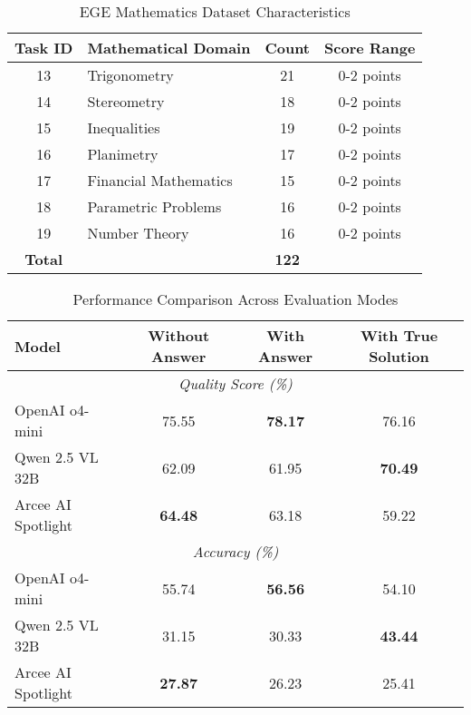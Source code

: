 \documentclass{article}
\begin{document}
\begin{table}[htbp]
\centering
\caption{EGE Mathematics Dataset Characteristics}
\label{tab:dataset_characteristics}
\begin{tabular}{@{}clcc@{}}
\toprule
\textbf{Task ID} & \textbf{Mathematical Domain} & \textbf{Count} & \textbf{Score Range} \\
\midrule
13 & Trigonometry & 21 & 0-2 points \\
14 & Stereometry & 18 & 0-2 points \\
15 & Inequalities & 19 & 0-2 points \\
16 & Planimetry & 17 & 0-2 points \\
17 & Financial Mathematics & 15 & 0-2 points \\
18 & Parametric Problems & 16 & 0-2 points \\
19 & Number Theory & 16 & 0-2 points \\
\midrule
\textbf{Total} & & \textbf{122} & \\
\bottomrule
\end{tabular}
\end{table}

\begin{table}[htbp]
\centering
\caption{Performance Comparison Across Evaluation Modes}
\label{tab:evaluation_modes}
\begin{tabular}{@{}lccc@{}}
\toprule
\textbf{Model} & \textbf{Without Answer} & \textbf{With Answer} & \textbf{With True Solution} \\
\midrule
\multicolumn{4}{c}{\textit{Quality Score (\%)}} \\
\midrule
OpenAI o4-mini & 75.55 & \textbf{78.17} & 76.16 \\
Qwen 2.5 VL 32B & 62.09 & 61.95 & \textbf{70.49} \\
Arcee AI Spotlight & \textbf{64.48} & 63.18 & 59.22 \\
\midrule
\multicolumn{4}{c}{\textit{Accuracy (\%)}} \\
\midrule
OpenAI o4-mini & 55.74 & \textbf{56.56} & 54.10 \\
Qwen 2.5 VL 32B & 31.15 & 30.33 & \textbf{43.44} \\
Arcee AI Spotlight & \textbf{27.87} & 26.23 & 25.41 \\
\bottomrule
\end{tabular}
\end{table}
\end{document}
